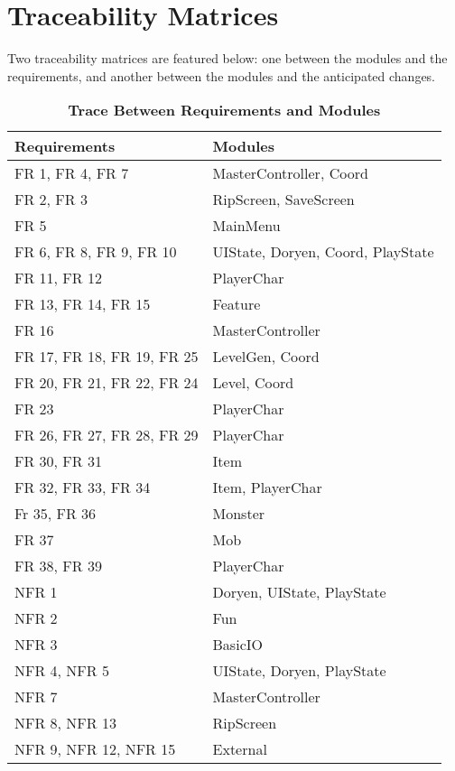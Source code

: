 \documentclass[12pt, titlepage]{article}
\newcommand{\rev}[1]{\textcolor{RevisionColour}{#1}}
\newcommand{\newSection}[1]{
  \newpage
  \section{#1}
}
\begin{document}
\newSection{Traceability Matrices} \label{SecTM}

    Two traceability matrices are featured below: one between the modules and the requirements, and another between the modules and the anticipated changes.

    \begin{table}[H]
        \label{TblRT}
        \caption{\bf Trace Between Requirements and Modules}
        
        \def\arraystretch{1.1}
        \centering
        \bigskip
        \begin{tabular}{p{} p{}}

            \toprule
            \textbf{Requirements} & \textbf{Modules}\\
            \midrule

            FR 1, FR 4, FR 7 & MasterController, Coord\\
            FR 2, FR 3 & RipScreen, \rev{SaveScreen}\\
            FR 5 & MainMenu\\
            FR 6, FR 8, FR 9, FR 10 & UIState, Doryen, Coord, PlayState\\
            FR 11, FR 12 & PlayerChar\\
            FR 13, FR 14, FR 15 & Feature\\
            FR 16 & MasterController\\
            FR 17, FR 18, FR 19, FR 25 & LevelGen, Coord\\
            FR 20, FR 21, FR 22, FR 24 & Level, Coord\\
            FR 23 & PlayerChar\\
            FR 26, FR 27, FR 28, FR 29 & PlayerChar\\
            FR 30, FR 31 & Item\\
            FR 32, FR 33, FR 34 & Item, PlayerChar\\
            Fr 35, FR 36 & Monster\\
            FR 37 & Mob\\
            FR 38, FR 39 & PlayerChar\\
            \midrule
            NFR 1 & Doryen, UIState, PlayState\\
            NFR 2 & Fun\\
            NFR 3 & BasicIO\\
            NFR 4, NFR 5 & UIState, Doryen, PlayState\\
            NFR 7 & MasterController\\
            NFR 8, NFR 13 & RipScreen\\
            NFR 9, NFR 12, NFR 15 & External\\

            \bottomrule
        \end{tabular}
    \end{table}
\end{document}
